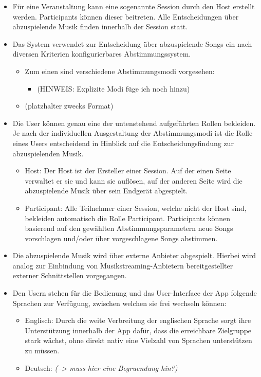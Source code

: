 \documentclass[oneside, ngerman]{sdqtechreport}
\begin{document}
\begin{itemize}
\begin{itemize}
        \end{itemize}
    \item Für eine Veranstaltung kann eine sogenannte Session durch den Host erstellt werden. Participants können dieser beitreten. Alle Entscheidungen über abzuspielende Musik finden innerhalb der Session statt.
    \item Das System verwendet zur Entscheidung über abzuspielende Songs ein nach diversen Kriterien konfigurierbares Abstimmungssystem.
    \begin{itemize}
        \item Zum einen sind verschiedene Abstimmungsmodi vorgesehen:
        \begin{itemize}
            \item (HINWEIS: Explizite Modi füge ich noch hinzu)
        \end{itemize}
        \item  (platzhalter zwecks Format)
    \end{itemize}
    \item Die User können genau eine der untenstehend aufgeführten Rollen bekleiden. Je nach der individuellen Ausgestaltung der Abstimmungsmodi ist die Rolle eines Users entscheidend in Hinblick auf die Entscheidungsfindung zur abzuspielenden Musik.
    \begin{itemize}
        \item Host: Der Host ist der Ersteller einer Session. Auf der einen Seite verwaltet er sie und kann sie auflösen, auf der anderen Seite wird die abzuspielende Musik über sein Endgerät abgespielt.
        \item Participant: Alle Teilnehmer einer Session, welche nicht der Host sind, bekleiden automatisch die Rolle Participant. Participants können basierend auf den gewählten Abstimmungsparametern neue Songs vorschlagen und/oder über vorgeschlagene Songs abstimmen. 
    \end{itemize}
    \item Die abzuspielende Musik wird über externe Anbieter abgespielt. Hierbei wird analog zur Einbindung von Musikstreaming-Anbietern bereitgestellter externer Schnittstellen vorgegangen.
    \item  Den Usern stehen für die Bedienung und das User-Interface der App folgende Sprachen zur Verfügung, zwischen welchen sie frei wechseln können:
    \begin{itemize}
        \item Englisch: Durch die weite Verbreitung der englischen Sprache sorgt ihre Unterstützung innerhalb der App dafür, dass die erreichbare Zielgruppe stark wächst, ohne direkt nativ eine Vielzahl von Sprachen unterstützen zu müssen.
        \item Deutsch: \textit{(--> muss hier eine Begruendung hin?)}
    \end{itemize}
    
    \end{itemize}
\end{document}
